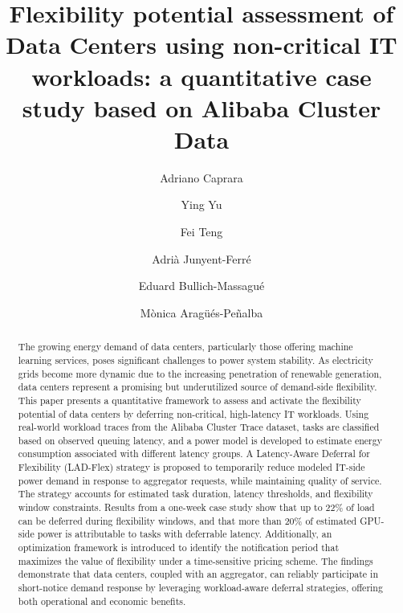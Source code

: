 \documentclass[preprint,12pt]{elsarticle}
\begin{document}
\begin{frontmatter}

\title{Flexibility potential assessment of Data Centers using non-critical IT workloads: a quantitative case study based on Alibaba Cluster Data} %

\author[1]{Adriano Caprara}

\author[2]{Ying Yu}

\author[2]{Fei Teng}

\author[2]{Adri\`{a} Junyent-Ferr\'{e}}

\author[1]{Eduard Bullich-Massagué}

\author[1]{M\`{o}nica Arag\"{u}\'{e}s-Pe\~{n}alba}




\begin{abstract}
The growing energy demand of data centers, particularly those offering machine learning services, poses significant challenges to power system stability. As electricity grids become more dynamic due to the increasing penetration of renewable generation, data centers represent a promising but underutilized source of demand-side flexibility. This paper presents a quantitative framework to assess and activate the flexibility potential of data centers by deferring non-critical, high-latency IT workloads. Using real-world workload traces from the Alibaba Cluster Trace dataset, tasks are classified based on observed queuing latency, and a power model is developed to estimate energy consumption associated with different latency groups. A Latency-Aware Deferral for Flexibility (LAD-Flex) strategy is proposed to temporarily reduce modeled IT-side power demand in response to aggregator requests, while maintaining quality of service. The strategy accounts for estimated task duration, latency thresholds, and flexibility window constraints. Results from a one-week case study show that up to 22\% of load can be deferred during flexibility windows, and that more than 20\% of estimated GPU-side power is attributable to tasks with deferrable latency. Additionally, an optimization framework is introduced to identify the notification period that maximizes the value of flexibility under a time-sensitive pricing scheme. The findings demonstrate that data centers, coupled with an aggregator, can reliably participate in short-notice demand response by leveraging workload-aware deferral strategies, offering both operational and economic benefits.
\end{abstract}


\end{frontmatter}
\end{document}
